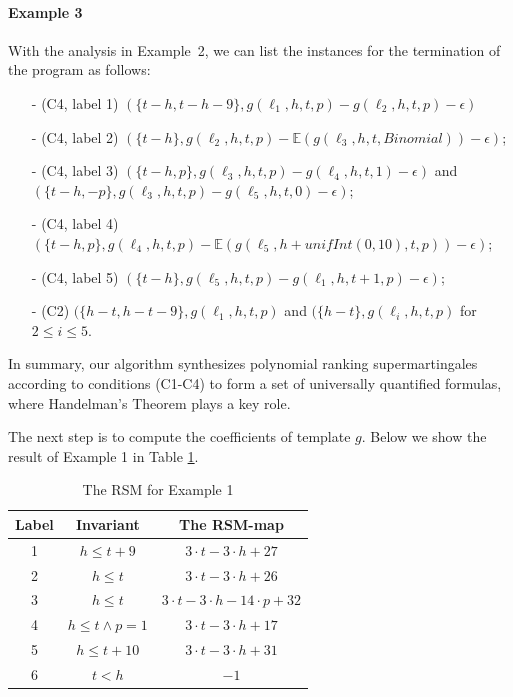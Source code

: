 \documentclass[runningheads]{llncs}
\begin{document}
\paragraph{Example 3} With the analysis in Example~2, we can list the instances for the termination of the program as follows:
\begin{itemize}
	\item[-] (C4, label 1) $(\{t-h, t-h-9\}, g(\ell_1,h,t,p)-g(\ell_2,h,t,p)-\epsilon)$
	\item[-] (C4, label 2) $(\{t-h\}, g(\ell_2,h,t,p)-\mathbb{E}(g(\ell_3,h,t,Binomial))-\epsilon)$;
	\item[-] (C4, label 3) $(\{t-h, p\}, g(\ell_3,h,t,p)-g(\ell_4,h,t,1)-\epsilon)$ and $(\{t-h, -p\}, g(\ell_3,h,t,p)-g(\ell_5,h,t,0)-\epsilon)$;
	\item[-] (C4, label 4) $(\{t-h, p\},g(\ell_4,h,t,p)-\mathbb{E}(g(\ell_5,h+unifInt(0,10),t,p))-\epsilon)$;
	\item[-] (C4, label 5) $(\{t-h\}, g(\ell_5,h,t,p)-g(\ell_1,h,t+1,p)-\epsilon)$;
	\item[-] (C2) $(\{h-t,h-t-9\}, g(\ell_1,h,t,p)$ and $(\{h-t\}, g(\ell_i,h,t,p)$ for $2\leq i \leq 5$.
\end{itemize}

In summary, our algorithm synthesizes polynomial ranking supermartingales according to conditions (C1-C4) to form a set of universally quantified formulas, where Handelman's Theorem plays a key  role.

The next step is to compute  the coefficients of template $g$. Below we show the result of Example 1 in Table \ref{RSM}. 

\begin{table}[htb]
	\centering
	\caption{The RSM for Example 1}
	\label{RSM}
	\begin{tabular}{|c|c|c|}
		\hline
		Label& Invariant & The RSM-map  \\ \hline
		1 & $h\leq t+9$ &$3\cdot t-3\cdot h+27$ \\ \hline
		2 & $h\leq t$ &$3\cdot t-3\cdot h+26$ \\ \hline
		3 & $h\leq t$  &$3\cdot t-3\cdot h-14\cdot p+32$ \\ \hline
		4 & $h\leq t\land p=1$ &$3\cdot t-3\cdot h+17$ \\ \hline
		5 & $h\leq t+10$&$3\cdot t-3\cdot h+31$ \\ \hline
		6 & $t<h$ &$-1$ \\ \hline
	\end{tabular}
\end{table}
\end{document}
